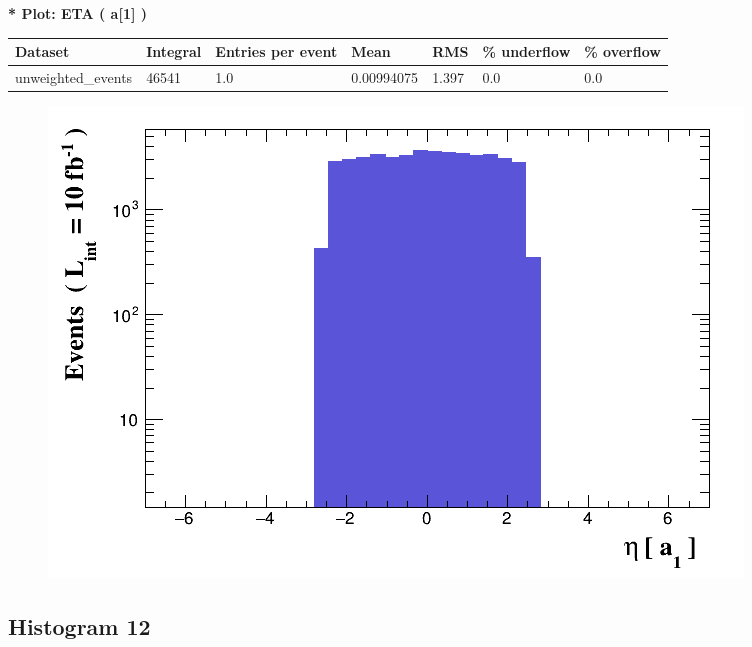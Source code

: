 \documentclass[a4paper, 10pt]{article}
\begin{document}
\textbf{* Plot: ETA ( a[1] ) }\\
   \begin{table}[H]
  \begin{center}
    \begin{tabular}{|m{23.0mm}|m{23.0mm}|m{18.0mm}|m{19.0mm}|m{19.0mm}|m{19.0mm}|m{19.0mm}|}
      \hline
      {\cellcolor{yellow}         Dataset}& {\cellcolor{yellow}         Integral}& {\cellcolor{yellow}         Entries per event}& {\cellcolor{yellow}         Mean}& {\cellcolor{yellow}         RMS}& {\cellcolor{yellow}         \% underflow}& {\cellcolor{yellow}         \% overflow}\\
      \hline
      {\cellcolor{white}         unweighted\_events}& {\cellcolor{white}         46541}& {\cellcolor{white}         1.0}& {\cellcolor{white}         0.00994075}& {\cellcolor{white}         1.397}& {\cellcolor{green}         0.0}& {\cellcolor{green}         0.0}\\
\hline
    \end{tabular}
  \end{center}
\end{table}

\begin{figure}[H]
  \begin{center}
    \includegraphics[scale=0.45]{selection_10.png}\\
\caption{   }
  \end{center}
\end{figure}
      \newpage
\subsection{ Histogram 12}
\end{document}
